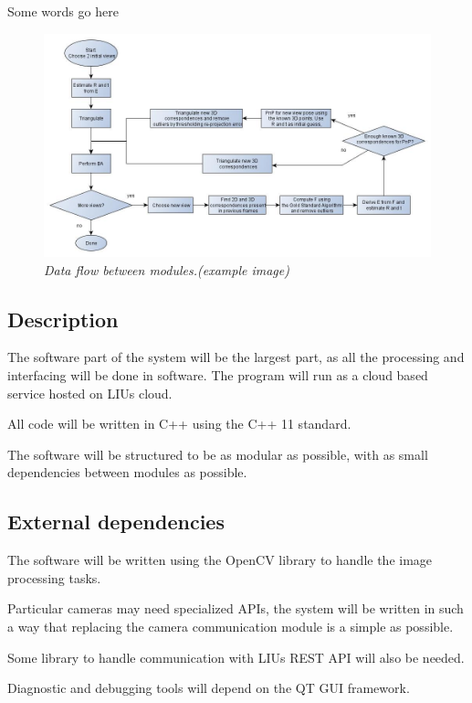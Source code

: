 Some words go here

\begin{figure}[htb]
	\centering
	\includegraphics[width=160mm]{images/example1.jpg}
	\caption[This text ends up at the list of figures]{\textit{Data flow between modules.(example image)}}
	\label{fig:block_overview_fig}  %
\end{figure}


\subsection{Description}
The software part of the system will be the largest part, as all the processing and interfacing will be done in software.
The program will run as a cloud based service hosted on LIUs cloud.

All code will be written in C++ using the C++ 11 standard.

The software will be structured to be as modular as possible, with as small dependencies between modules as possible.

\subsection{External dependencies}
The software will be written using the OpenCV library to handle the image processing tasks.

Particular cameras may need specialized APIs, the system will be written in such a way that replacing the camera communication module is a simple as possible.

Some library to handle communication with LIUs REST API will also be needed.

Diagnostic and debugging tools will depend on the QT GUI framework.

